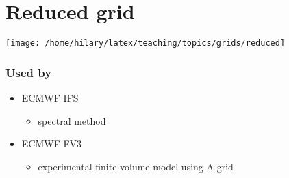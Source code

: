\begin{minipage}[t]{0.48\columnwidth}%

\section*{Reduced grid}

\texttt{[image: /home/hilary/latex/teaching/topics/grids/reduced]}%
\end{minipage} \hfill{}%
\begin{minipage}[t]{0.47\columnwidth}%

\subsubsection*{Used by}
\begin{itemize}
\item ECMWF IFS
\begin{itemize}
\item spectral method
\end{itemize}
\item ECMWF FV3
\begin{itemize}
\item experimental finite volume model using A-grid
\end{itemize}
\end{itemize}
%
\end{minipage}

\clearpage{}

